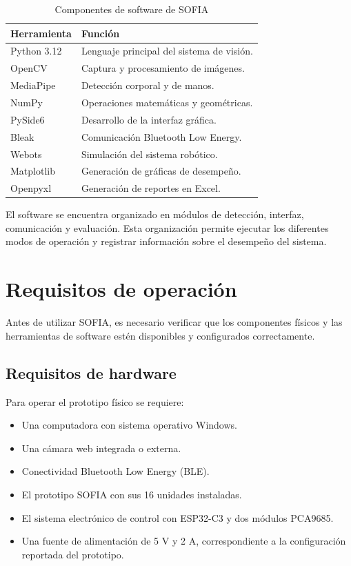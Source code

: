 \documentclass[letterpaper,journal]{IEEEtran}
\begin{document}
\begin{table}[!t]
    \caption{Componentes de software de SOFIA}
    \label{tab:componentes_software}
    \centering
    \footnotesize
    \begin{tabularx}{\columnwidth}{l X}
        \toprule
        \textbf{Herramienta} & \textbf{Función} \\
        \midrule
        Python 3.12 & Lenguaje principal del sistema de visión. \\
        OpenCV & Captura y procesamiento de imágenes. \\
        MediaPipe & Detección corporal y de manos. \\
        NumPy & Operaciones matemáticas y geométricas. \\
        PySide6 & Desarrollo de la interfaz gráfica. \\
        Bleak & Comunicación Bluetooth Low Energy. \\
        Webots & Simulación del sistema robótico. \\
        Matplotlib & Generación de gráficas de desempeño. \\
        Openpyxl & Generación de reportes en Excel. \\
        \bottomrule
    \end{tabularx}
\end{table}

El software se encuentra organizado en módulos de detección,
interfaz, comunicación y evaluación. Esta organización
permite ejecutar los diferentes modos de operación y
registrar información sobre el desempeño del sistema.

\section{Requisitos de operación}
\label{sec:requisitos}

Antes de utilizar SOFIA, es necesario verificar que
los componentes físicos y las herramientas de software
estén disponibles y configurados correctamente.

\subsection{Requisitos de hardware}

Para operar el prototipo físico se requiere:

\begin{itemize}
    \item Una computadora con sistema operativo Windows.
    \item Una cámara web integrada o externa.
    \item Conectividad Bluetooth Low Energy (BLE).
    \item El prototipo SOFIA con sus 16 unidades instaladas.
    \item El sistema electrónico de control con ESP32-C3
    y dos módulos PCA9685.
    \item Una fuente de alimentación de 5 V y 2 A,
    correspondiente a la configuración reportada
    del prototipo.
\end{itemize}
\end{document}

